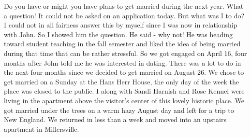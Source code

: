 Do you have or might you have plans to get married during the next year.
What a question! It could not be asked on an application today.
But what was I to do? I could not in all fairness answer this by myself since I was now in relationship with John.
So I showed him the question.
He said - why not! He was heading toward student teaching in the fall semester and liked the idea of being married during that time that can be rather stressful.
So we got engaged on April 16, four months after John told me he was interested in dating.
There was a lot to do in the next four months since we decided to get married on August 26.
We chose to get married on a Sunday at the Hans Herr House, the only day of the week the place was closed to the public.
I along with Sandi Harnish and Rose Kennel were living in the apartment above the visitor's center of this lovely historic place.
We got married under the trees on a warm hazy August day and left for a trip to New England.
We returned in less than a week and moved into an upstairs apartment in Millersville.





